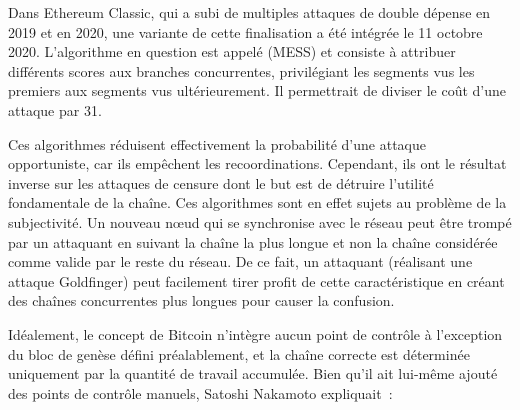 Dans Ethereum Classic, qui a subi de multiples attaques de double dépense en 2019 et en 2020, une variante de cette finalisation a été intégrée le 11 octobre 2020. L'algorithme en question est appelé  (MESS) et consiste à attribuer différents scores aux branches concurrentes, privilégiant les segments vus les premiers aux segments vus ultérieurement. Il permettrait de diviser le coût d'une attaque par 31.

Ces algorithmes réduisent effectivement la probabilité d'une attaque opportuniste, car ils empêchent les recoordinations. Cependant, ils ont le résultat inverse sur les attaques de censure dont le but est de détruire l'utilité fondamentale de la chaîne. Ces algorithmes sont en effet sujets au problème de la subjectivité. Un nouveau nœud qui se synchronise avec le réseau peut être trompé par un attaquant en suivant la chaîne la plus longue et non la chaîne considérée comme valide par le reste du réseau. De ce fait, un attaquant (réalisant une attaque Goldfinger) peut facilement tirer profit de cette caractéristique en créant des chaînes concurrentes plus longues pour causer la confusion.

Idéalement, le concept de Bitcoin n'intègre aucun point de contrôle à l'exception du bloc de genèse défini préalablement, et la chaîne correcte est déterminée uniquement par la quantité de travail accumulée. Bien qu'il ait lui-même ajouté des points de contrôle manuels, Satoshi Nakamoto expliquait~:

